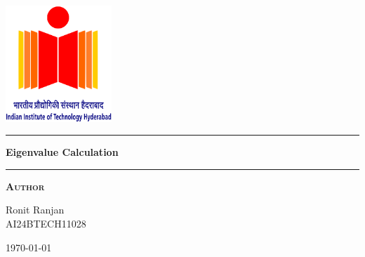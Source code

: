 
\begin{titlepage}
\begin{center}
\vspace{2cm}
\includegraphics[width=0.3\textwidth]{root/iith logo.png}~\\[1cm]
\vspace{2cm}

\hrule
\vspace{.5cm}
{ \huge \bfseries Eigenvalue Calculation} %
\vspace{.5cm}

\hrule
\vspace{1.5cm}

\textsc{\textbf{Author}}\\
\vspace{.5cm}
\centering

Ronit Ranjan \\
AI24BTECH11028

\vspace{4cm}

\centering \today %
\end{center}
\end{titlepage}